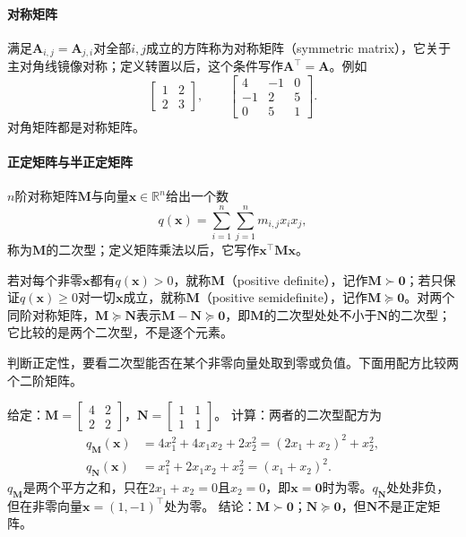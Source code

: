 \paragraph{对称矩阵}
满足$\bm A_{i,j}=\bm A_{j,i}$对全部$i,j$成立的方阵称为对称矩阵（symmetric matrix），它关于主对角线镜像对称；定义转置以后，这个条件写作$\bm A^\top=\bm A$。例如
\[
 \begin{bmatrix}1&2\\2&3\end{bmatrix},\qquad
 \begin{bmatrix}4&-1&0\\-1&2&5\\0&5&1\end{bmatrix}.
\]
对角矩阵都是对称矩阵。

\paragraph{正定矩阵与半正定矩阵}
$n$阶对称矩阵$\bm M$与向量$\bm x\in\mathbb R^n$给出一个数
\[
 q(\bm x)=\sum_{i=1}^n\sum_{j=1}^n m_{i,j}x_ix_j,
\]
称为$\bm M$的二次型；定义矩阵乘法以后，它写作$\bm x^\top\bm M\bm x$。

若对每个非零$\bm x$都有$q(\bm x)>0$，就称$\bm M$（positive definite），记作$\bm M\succ\bm0$；若只保证$q(\bm x)\geq0$对一切$\bm x$成立，就称$\bm M$（positive semidefinite），记作$\bm M\succeq\bm0$。对两个同阶对称矩阵，$\bm M\succeq\bm N$表示$\bm M-\bm N\succeq\bm0$，即$\bm M$的二次型处处不小于$\bm N$的二次型；它比较的是两个二次型，不是逐个元素。

判断正定性，要看二次型能否在某个非零向量处取到零或负值。下面用配方比较两个二阶矩阵。
\begin{example}[用配方区分正定与半正定]
\label{ex:ls-pd-psd-completing-square}
给定：$\bm M=\left[\begin{smallmatrix}4&2\\2&2\end{smallmatrix}\right]$，$\bm N=\left[\begin{smallmatrix}1&1\\1&1\end{smallmatrix}\right]$。
计算：两者的二次型配方为
\[
 \begin{aligned}
 q_{\bm M}(\bm x)&=4x_1^2+4x_1x_2+2x_2^2=(2x_1+x_2)^2+x_2^2,\\
 q_{\bm N}(\bm x)&=x_1^2+2x_1x_2+x_2^2=(x_1+x_2)^2.
 \end{aligned}
\]
$q_{\bm M}$是两个平方之和，只在$2x_1+x_2=0$且$x_2=0$，即$\bm x=\bm0$时为零。$q_{\bm N}$处处非负，但在非零向量$\bm x=(1,-1)^\top$处为零。
结论：$\bm M\succ\bm0$；$\bm N\succeq\bm0$，但$\bm N$不是正定矩阵。
\end{example}

